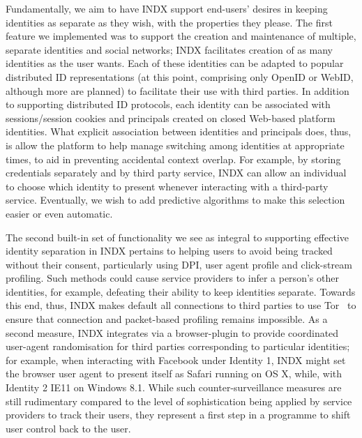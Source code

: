 \documentclass{sig-alternate}
\begin{document}
Fundamentally, we aim to have INDX support end-users' desires in keeping identities as separate as they wish, with the properties they please.  The first feature we implemented was to support the creation and maintenance of multiple, separate identities and social networks; INDX facilitates creation of as many  identities as the user wants.  Each of these identities can be adapted to popular distributed ID representations (at this point, comprising only OpenID or WebID, although more are planned) to facilitate their use with third parties.  In addition to supporting distributed ID protocols, each identity can be associated with sessions/session cookies and principals created on closed Web-based platform identities.   What explicit association between identities and principals does, thus, is allow the platform to help manage switching among identities at appropriate times, to aid in preventing accidental context overlap.  For example, by storing credentials separately and by third party service, INDX can allow an individual to choose which identity to present whenever interacting with a third-party service. Eventually, we wish to add predictive algorithms to make this selection easier or even automatic.

The second built-in set of functionality we see as integral to supporting effective identity separation in INDX pertains to helping users to avoid being tracked without their consent, particularly using DPI, user agent profile and click-stream profiling.  Such methods could cause service providers to infer a person's other identities, for example, defeating their ability to keep identities separate.  Towards this end, thus, INDX makes default all connections to third parties to use Tor~\cite{tor} to ensure that connection and packet-based profiling remains impossible.  As a second measure, INDX integrates via a browser-plugin to provide coordinated user-agent randomisation for third parties corresponding to particular identities; for example, when interacting with Facebook under Identity 1, INDX might set the browser user agent to present itself as Safari running on OS X, while, with Identity 2 IE11 on Windows 8.1.  While such counter-surveillance measures are still rudimentary compared to the level of sophistication being applied by service providers to track their users, they represent a first step in a programme to shift user control back to the user.

% 
\end{document}
